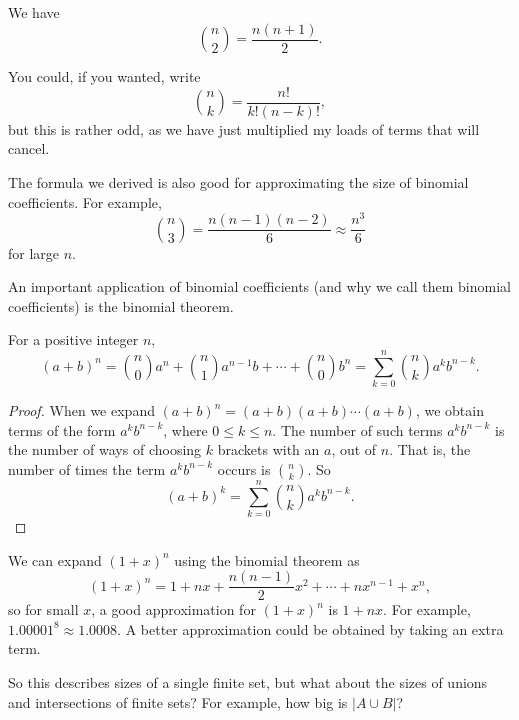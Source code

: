 \documentclass[a4paper]{scrartcl}
\begin{document}
\begin{example}
	We have
	$$
	\binom{n}{2} = \frac{n(n + 1)}{2}.
	$$
\end{example}

\begin{remark}
	You could, if you wanted, write
$$
\binom{n}{k} = \frac{n!}{k!(n - k)!},
$$
but this is rather odd, as we have just multiplied my loads of terms that will cancel.
\end{remark}

The formula we derived is also good for approximating the size of binomial coefficients. For example,
$$
\binom{n}{3} = \frac{n(n - 1)(n - 2)}{6} \approx \frac{n^3}{6}
$$
for large $n$.


An important application of binomial coefficients (and why we call them binomial coefficients) is the binomial theorem.

\begin{theorem}
	For a positive integer $n$,
	$$
	(a + b)^n = \binom{n}{0}a^n + \binom{n}{1}a^{n - 1}b + \cdots + \binom{n}{0}b^n = \sum_{k = 0}^{n}\binom{n}{k}a^{k}b^{n - k}.
	$$
\end{theorem}
\begin{proof}
	When we expand $(a + b)^n = (a + b)(a + b)\cdots(a + b)$, we obtain terms of the form $a^k b^{n - k}$, where $0 \leq k \leq n$. The number of such terms $a^k b^{n - k}$ is the number of ways of choosing $k$ brackets with an $a$, out of $n$. That is, the number of times the term $a^k b^{n - k}$ occurs is $\binom{n}{k}$. So
	$$
	(a + b)^k = \sum_{k = 0}^{n}\binom{n}{k}a^{k}b^{n - k}.
	$$
\end{proof}

\begin{example}
	We can expand $(1 + x)^n$ using the binomial theorem as
	$$
	(1 + x)^n = 1 + nx + \frac{n(n - 1)}{2}x^2 + \cdots + n x^{n - 1} + x^n,
	$$
	so for small $x$, a good approximation for $(1 + x)^n$ is $1 + nx$. For example, $1.00001^8 \approx 1.0008$. A better approximation could be obtained by taking an extra term.
\end{example}

So this describes sizes of a single finite set, but what about the sizes of unions and intersections of finite sets? For example, how big is $|A \cup B|$?
\end{document}
